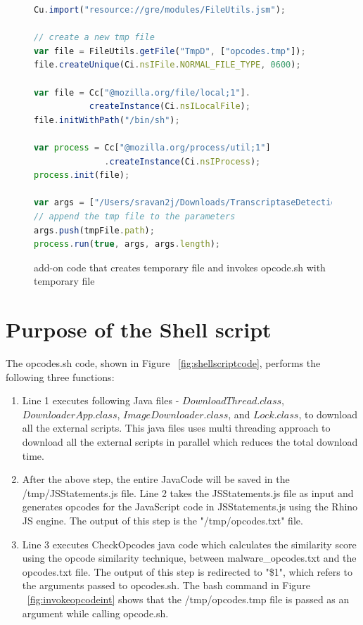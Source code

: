 \begin{figure}[h]
  \centering
\begin{lstlisting}[frame=single,language=JavaScript,mathescape=false]
Cu.import("resource://gre/modules/FileUtils.jsm");

// create a new tmp file
var file = FileUtils.getFile("TmpD", ["opcodes.tmp"]);
file.createUnique(Ci.nsIFile.NORMAL_FILE_TYPE, 0600);

var file = Cc["@mozilla.org/file/local;1"].
           createInstance(Ci.nsILocalFile);
file.initWithPath("/bin/sh");

var process = Cc["@mozilla.org/process/util;1"]
              .createInstance(Ci.nsIProcess);
process.init(file);

var args = ["/Users/sravan2j/Downloads/TranscriptaseDetectionAddon/data/opcode.sh"];
// append the tmp file to the parameters
args.push(tmpFile.path);
process.run(true, args, args.length);
\end{lstlisting}
\caption[add-on code to invoke opcode.sh]{add-on code that creates temporary file and invokes opcode.sh with temporary file}
    \label{fig:invokeopcode}
\end{figure}

\section{Purpose of the Shell script}

The opcodes.sh code, shown in Figure ~\ref{fig:shellscriptcode}, performs the following three functions:
\begin{enumerate}
\item Line 1 executes following Java files - $DownloadThread.class$, $DownloaderApp.class$, $ImageDownloader.class$, and $Lock.class$, to download all the external scripts. This java files uses multi threading approach to download all the external scripts in parallel which reduces the total download time.  
\item After the above step, the entire JavaCode will be saved in the /tmp/JSStatements.js file. Line 2 takes the JSStatements.js file as input and generates opcodes for the JavaScript code in JSStatements.js using the Rhino JS engine. The output of this step is the "/tmp/opcodes.txt" file.
\item Line 3 executes CheckOpcodes java code which calculates the similarity score using the opcode similarity technique, between malware\_opcodes.txt and the opcodes.txt file. The output of this step is redirected to "\$1", which refers to the arguments passed to opcodes.sh. The bash command in Figure ~\ref{fig:invokeopcodeint} shows that the /tmp/opcodes.tmp file is passed as an argument while calling opcode.sh. 
\end{enumerate}

